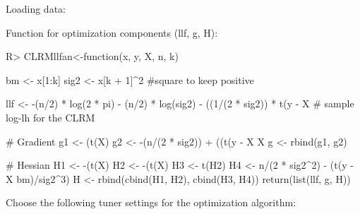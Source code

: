 \documentclass[11pt,reqno]{amsart}   %
\newcommand{\ksp}{\vspace{0.1in}}   %
\begin{document}
Loading data:
\begin{Schunk}
\end{Schunk}

\ksp
Function for optimization components (llf, g, H):

\begin{Schunk}
\begin{Sinput}
R> CLRMllfan<-function(x, y, X, n, k){
     bm <- x[1:k]
     sig2 <- x[k + 1]^2  #square to keep positive
     
     llf <- -(n/2) * log(2 * pi) - (n/2) * log(sig2) - ((1/(2 *
         sig2)) * t(y - X %*% bm) %*% (y - X %*% bm))
     # sample log-lh for the CLRM
     
     # Gradient
     g1 <- (t(X) %*% (y - X %*% bm))/sig2
     g2 <- -(n/(2 * sig2)) + ((t(y - X %*% bm) %*% (y -
         X %*% bm))/((2 * sig2^2)))
     g <- rbind(g1, g2)
     
     # Hessian
     H1 <- -(t(X) %*% X)/sig2
     H2 <- -(t(X) %*% (y - X %*% bm))/(sig2^2)
     H3 <- t(H2)
     H4 <- n/(2 * sig2^2) - (t(y - X %*% bm) %*% (y - X %*%
         bm)/sig2^3)
     H <- rbind(cbind(H1, H2), cbind(H3, H4))
     return(list(llf, g, H))
 }
\end{Sinput}
\end{Schunk}

Choose the following tuner settings for the optimization algorithm:\\
\end{document}
